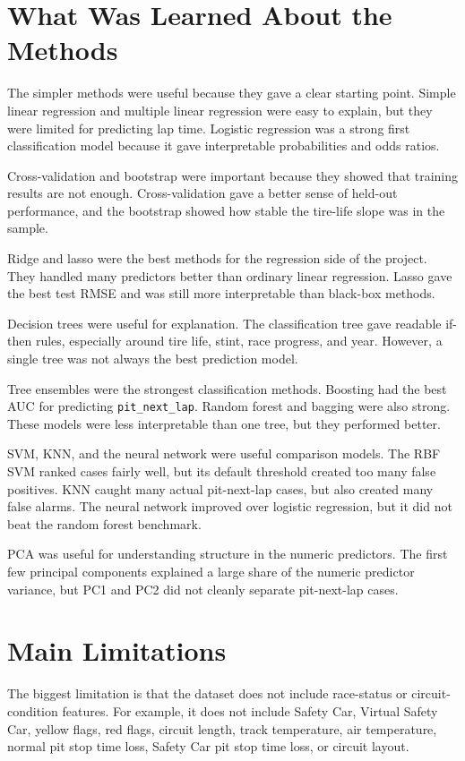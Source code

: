 \documentclass[11pt,oneside,openany]{book}
\begin{document}
\section{What Was Learned About the Methods}

The simpler methods were useful because they gave a clear starting point. Simple linear regression and multiple linear regression were easy to explain, but they were limited for predicting lap time. Logistic regression was a strong first classification model because it gave interpretable probabilities and odds ratios.

Cross-validation and bootstrap were important because they showed that training results are not enough. Cross-validation gave a better sense of held-out performance, and the bootstrap showed how stable the tire-life slope was in the sample.

Ridge and lasso were the best methods for the regression side of the project. They handled many predictors better than ordinary linear regression. Lasso gave the best test RMSE and was still more interpretable than black-box methods.

Decision trees were useful for explanation. The classification tree gave readable if-then rules, especially around tire life, stint, race progress, and year. However, a single tree was not always the best prediction model.

Tree ensembles were the strongest classification methods. Boosting had the best AUC for predicting \texttt{pit\_next\_lap}. Random forest and bagging were also strong. These models were less interpretable than one tree, but they performed better.

SVM, KNN, and the neural network were useful comparison models. The RBF SVM ranked cases fairly well, but its default threshold created too many false positives. KNN caught many actual pit-next-lap cases, but also created many false alarms. The neural network improved over logistic regression, but it did not beat the random forest benchmark.

PCA was useful for understanding structure in the numeric predictors. The first few principal components explained a large share of the numeric predictor variance, but PC1 and PC2 did not cleanly separate pit-next-lap cases.

\section{Main Limitations}

The biggest limitation is that the dataset does not include race-status or circuit-condition features. For example, it does not include Safety Car, Virtual Safety Car, yellow flags, red flags, circuit length, track temperature, air temperature, normal pit stop time loss, Safety Car pit stop time loss, or circuit layout.
\end{document}
